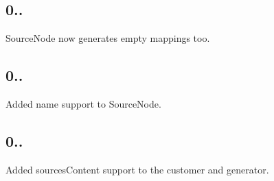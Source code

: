 \subsection*{0..}


\begin{DoxyItemize}
\item Source\+Node now generates empty mappings too.
\end{DoxyItemize}

\subsection*{0..}


\begin{DoxyItemize}
\item Added name support to Source\+Node.
\end{DoxyItemize}

\subsection*{0..}


\begin{DoxyItemize}
\item Added sources\+Content support to the customer and generator. 
\end{DoxyItemize}